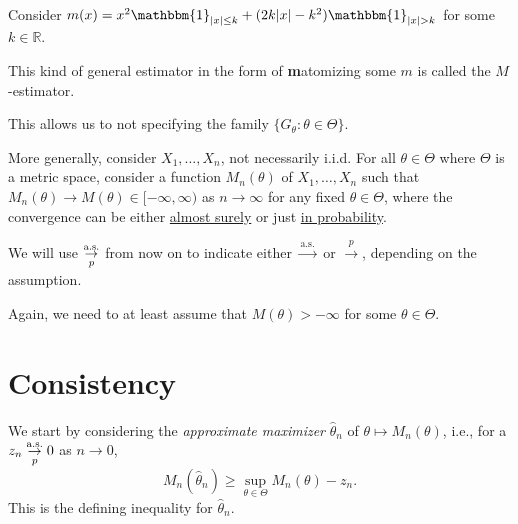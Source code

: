 \begin{eg}
	Consider \(m(x) = x^2 \mathbbm{1}_{\lvert x \rvert \leq k} + (2k\lvert x \rvert - k^2) \mathbbm{1}_{\lvert x \rvert > k} \) for some \(k \in \mathbb{R} \).
\end{eg}

This kind of general estimator in the form of \textbf{m}atomizing some \(m\) is called the \(M\)-estimator.

\begin{definition}[\(M\)-estimator]\label{def:M-estimator}
\end{definition}

\begin{intuition}
	This allows us to not specifying the family \(\{ G_\theta \colon \theta \in \Theta  \} \).
\end{intuition}

More generally, consider \(X_1, \dots , X_n \), not necessarily i.i.d. For all \(\theta \in \Theta \) where \(\Theta \) is a metric space, consider a function \(M_n(\theta )\) of \(X_1, \dots , X_n\) such that \(M_n(\theta ) \to M(\theta ) \in [-\infty , \infty )\) as \(n \to \infty \) for any fixed \(\theta \in \Theta \), where the convergence can be either \hyperref[def:converge-almost-surely]{almost surely} or just \hyperref[def:converge-in-probability]{in probability}.

\begin{notation}
	We will use \(\overunderset{\text{a.s.}}{p}{\to } \) from now on to indicate either \(\overset{\text{a.s.} }{\to} \) or \(\overset{p}{\to} \), depending on the assumption.
\end{notation}



\begin{note}
	Again, we need to at least assume that \(M(\theta ) > -\infty \) for some \(\theta  \in \Theta \).
\end{note}

\section{Consistency}
We start by considering the \emph{approximate maximizer} \(\hat{\theta} _n\) of \(\theta \mapsto M_n(\theta )\), i.e., for a \(z_n \overunderset{\text{a.s.}}{p}{\to } 0\) as \(n \to 0\),
\begin{equation}\label{eq:M-estimator}
	M_n(\hat{\theta} _n)
	\geq \sup _{\theta \in \Theta } M_n(\theta ) - z_n.
\end{equation}
This is the defining inequality for \(\hat{\theta} _n\).

